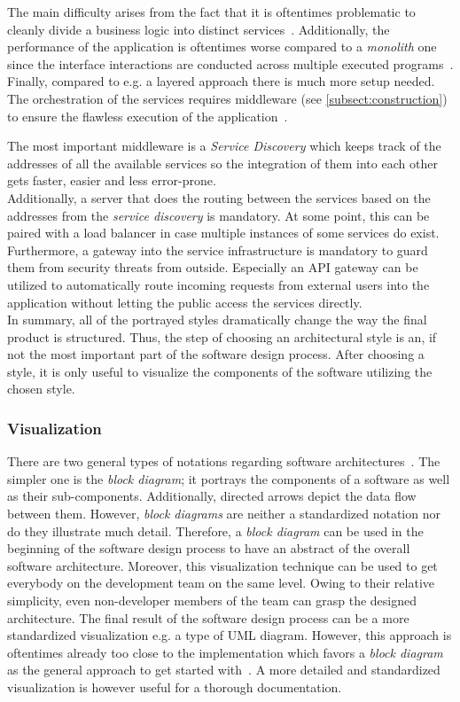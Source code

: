 \documentclass[12pt,a4paper]{report}
\begin{document}
The main difficulty arises from the fact that it is oftentimes problematic to cleanly
divide a business logic into distinct services~\cite{fowler-monolith-first}.
Additionally, the performance of the application is oftentimes worse compared to
a \textit{monolith} one since the interface interactions are conducted across multiple
executed programs~\cite{richards-sa-patterns}.
Finally, compared to e.g. a layered approach there is much more setup needed.
The orchestration of the services requires middleware (see \ref{subsect:construction})
to ensure the flawless execution of the application~\cn.

The most important middleware is a \textit{Service Discovery} which keeps track
of the addresses of all the available services so the integration of them into
each other gets faster, easier and less error-prone.\\
Additionally, a server that does the routing between the services based on the
addresses from the \textit{service discovery} is mandatory. At some point,
this can be paired with a load balancer in case multiple instances of some
services do exist.\\
Furthermore, a gateway into the service infrastructure is mandatory to guard
them from security threats from outside. Especially an API gateway can be
utilized to automatically route incoming requests from external users into the
application without letting the public access the services directly.\\

In summary, all of the portrayed styles dramatically change the way the final product
is structured. Thus, the step of choosing an architectural style is an, if not the
most important part of the software design process. After choosing a style,
it is only useful to visualize the components of the software utilizing the chosen style.


\subsubsection{Visualization}

There are two general types of notations regarding software architectures~\cite{sommerville-se}.
The simpler one is the \textit{block diagram}; it portrays the components of
a software as well as their sub-components. Additionally, directed arrows depict
the data flow between them. However, \textit{block diagrams} are neither a
standardized notation nor do they illustrate much detail.
Therefore, a \textit{block diagram} can be used in the beginning of the software
design process to have an abstract of the overall software architecture.
Moreover, this visualization technique can be used to get everybody on the development team
on the same level. Owing to their relative simplicity, even non-developer members
of the team can grasp the designed architecture. The final result of
the software design process can be a more standardized visualization
e.g. a type of UML diagram. However, this approach is oftentimes already too close
to the implementation which favors a \textit{block diagram} as the general
approach to get started with~\cite{sommerville-se}. A more detailed and standardized
visualization is however useful for a thorough documentation.
\end{document}
